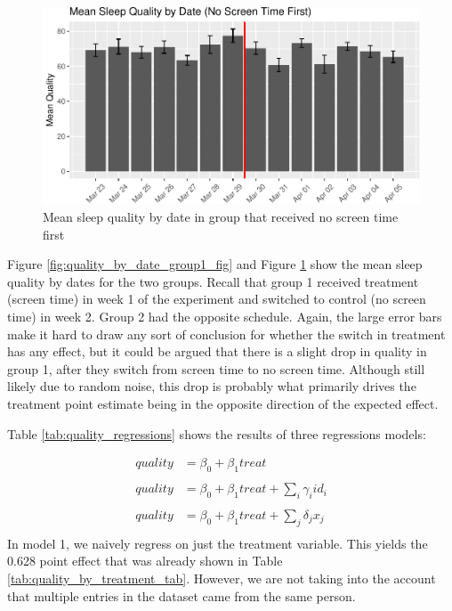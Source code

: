 \documentclass[12pt,]{article}
\begin{document}
\begin{figure}
\centering
\includegraphics{report_files/figure-latex/quality_by_date_group2_fig-1.pdf}
\caption{\label{fig:quality_by_date_group2_fig} Mean sleep quality by
date in group that received no screen time first}
\end{figure}

Figure \ref{fig:quality_by_date_group1_fig} and Figure
\ref{fig:quality_by_date_group2_fig} show the mean sleep quality by
dates for the two groups. Recall that group 1 received treatment (screen
time) in week 1 of the experiment and switched to control (no screen
time) in week 2. Group 2 had the opposite schedule. Again, the large
error bars make it hard to draw any sort of conclusion for whether the
switch in treatment has any effect, but it could be argued that there is
a slight drop in quality in group 1, after they switch from screen time
to no screen time. Although still likely due to random noise, this drop
is probably what primarily drives the treatment point estimate being in
the opposite direction of the expected effect.

Table \ref{tab:quality_regressions} shows the results of three
regressions models:

\[
\begin{aligned}
    quality &= \beta_0 + \beta_1 treat \\\\
    quality &= \beta_0 + \beta_1 treat + \sum_i \gamma_i id_i \\\\
    quality &= \beta_0 + \beta_1 treat + \sum_j \delta_j x_j \\
\end{aligned}
\] In model 1, we naively regress on just the treatment variable. This
yields the 0.628 point effect that was already shown in Table
\ref{tab:quality_by_treatment_tab}. However, we are not taking into the
account that multiple entries in the dataset came from the same person.
\end{document}

